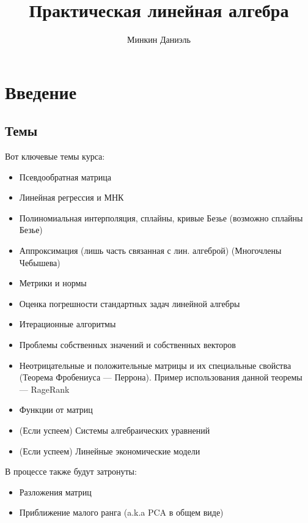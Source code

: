 \documentclass{article}
\title{Практическая линейная алгебра}
\author{Минкин Даниэль}
\begin{document}
    \maketitle

    \tableofcontents %

    \section{Введение}

    \subsection{Темы}

    Вот ключевые темы курса:

    \begin{itemize}
        \item Псевдообратная матрица
        \item Линейная регрессия и МНК
        \item Полиномиальная интерполяция, сплайны, кривые Безье (возможно сплайны Безье)
        \item Аппроксимация (лишь часть связанная с лин. алгеброй) (Многочлены Чебышева)
        \item Метрики и нормы
        \item Оценка погрешности стандартных задач линейной алгебры
        \item Итерационные алгоритмы
        \item Проблемы собственных значений и собственных векторов
        \item Неотрицательные и положительные матрицы и их специальные свойства (Теорема Фробениуса — Перрона). Пример использования данной теоремы --- RageRank
        \item Функции от матриц
        \item (Если успеем) Системы алгебраических уравнений
        \item (Если успеем) Линейные экономические модели
    \end{itemize}

    \quad

    В процессе также будут затронуты:

    \quad

    \begin{itemize}
        \item Разложения матриц
        \item Приближение малого ранга (a.k.a PCA в общем виде)
    \end{itemize}
\end{document}
